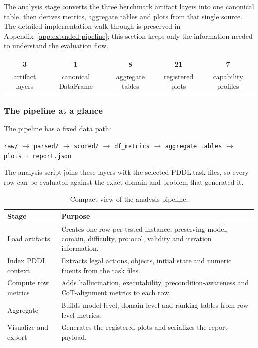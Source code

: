 The analysis stage converts the three benchmark artifact layers into one canonical table, then derives metrics, aggregate tables and plots from that single source. The detailed implementation walk-through is preserved in Appendix~\ref{app:extended-pipeline}; this section keeps only the information needed to understand the evaluation flow.

\begin{center}\small
\begin{tabular}{@{}ccccc@{}}
\toprule
\textbf{3} & \textbf{1} & \textbf{8} & \textbf{21} & \textbf{7}\\
artifact layers & canonical DataFrame & aggregate tables & registered plots & capability profiles\\
\bottomrule
\end{tabular}
\end{center}

\subsubsection{The pipeline at a glance}

The pipeline has a fixed data path:

\begin{center}
\small
\texttt{raw/} $\rightarrow$ \texttt{parsed/} $\rightarrow$ \texttt{scored/} $\rightarrow$ \texttt{df\_metrics} $\rightarrow$ \texttt{aggregate tables} $\rightarrow$ \texttt{plots + report.json}
\end{center}
The analysis script joins these layers with the selected PDDL task files, so every row can be evaluated against the exact domain and problem that generated it.

\begin{table}[H]\small
\centering
\begin{tabularx}{\linewidth}{@{}l Y@{}}
\toprule
\textbf{Stage} & \textbf{Purpose}\\
\midrule
Load artifacts & Creates one row per tested instance, preserving model, domain, difficulty, protocol, validity and iteration information.\\
\addlinespace
Index PDDL context & Extracts legal actions, objects, initial state and numeric fluents from the task files.\\
\addlinespace
Compute row metrics & Adds hallucination, executability, precondition-awareness and CoT-alignment metrics to each row.\\
\addlinespace
Aggregate & Builds model-level, domain-level and ranking tables from row-level metrics.\\
\addlinespace
Visualize and export & Generates the registered plots and serializes the report payload.\\
\bottomrule
\end{tabularx}
\caption{Compact view of the analysis pipeline.}
\label{tab:pipeline-compact}
\end{table}

